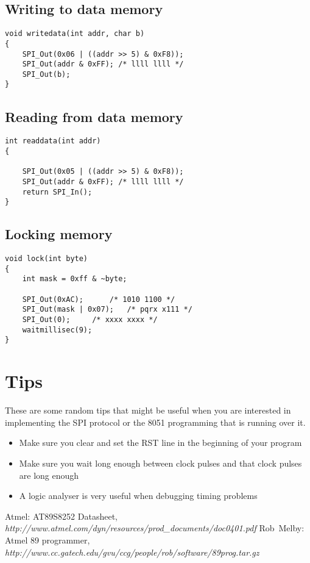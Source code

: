 \documentclass[a4paper]{article}
\begin{document}
\subsection{Writing to data memory}

\begin{lstlisting}
void writedata(int addr, char b)
{
	SPI_Out(0x06 | ((addr >> 5) & 0xF8));
	SPI_Out(addr & 0xFF); /* llll llll */
	SPI_Out(b);
}
\end{lstlisting}

\subsection{Reading from data memory}
\begin{lstlisting}
int readdata(int addr)
{

	SPI_Out(0x05 | ((addr >> 5) & 0xF8));
	SPI_Out(addr & 0xFF); /* llll llll */
	return SPI_In();
}
\end{lstlisting}

\subsection{Locking memory}

\begin{lstlisting}
void lock(int byte)
{
	int mask = 0xff & ~byte;

	SPI_Out(0xAC);		/* 1010 1100 */
	SPI_Out(mask | 0x07);	/* pqrx x111 */
	SPI_Out(0);		/* xxxx xxxx */
	waitmillisec(9);
}
\end{lstlisting}

\section{Tips}

These are some random tips that might be useful when you are interested in
implementing the SPI protocol or the 8051 programming that is running over it.

\begin{itemize}
\item Make sure you clear and set the RST line in 
the beginning of your program
\item Make sure you wait long enough between clock pulses and that 
clock pulses are long enough
\item A logic analyser is very useful when debugging timing problems
\end{itemize}

\nocite{*}

\begin{thebibliography}{99}
\bibitem{} Atmel: AT89S8252 Datasheet, \emph{http://www.atmel.com/dyn/resources/prod\_documents/doc0401.pdf}
\bibitem{} Rob~Melby: Atmel 89 programmer, \emph{http://www.cc.gatech.edu/gvu/ccg/people/rob/software/89prog.tar.gz}
\end{thebibliography}
\end{document}
